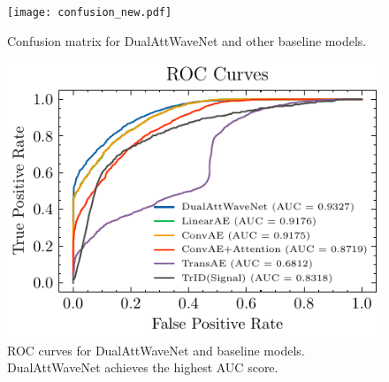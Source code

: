 \documentclass[conference]{IEEEtran}
\begin{document}
\begin{figure}[htbp]
    \centering
    \texttt{[image: confusion\_new.pdf]}
    \caption{Confusion matrix for DualAttWaveNet and other baseline models.}
    \label{fig:confusion_matrix}
\end{figure}






\begin{figure}[htbp]
    \centering
    \includegraphics[width=0.9\linewidth]{roc-comparison.pdf}
    \caption{ROC curves for DualAttWaveNet and baseline models. DualAttWaveNet achieves the highest AUC score.}
    \label{fig:roc_comparison}
\end{figure}






\end{document}
